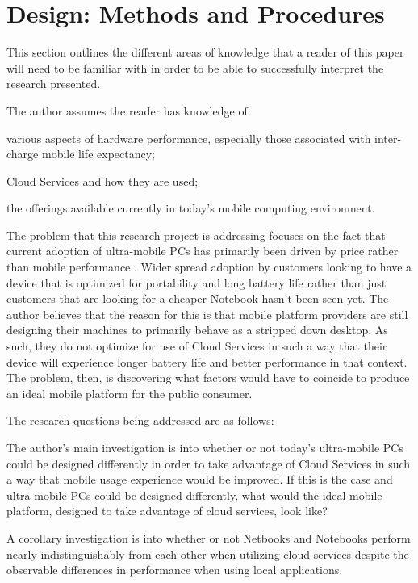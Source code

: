 \section{Design: Methods and Procedures}

This section outlines the different areas of knowledge that a reader of this
paper will need to be familiar with in order to be able to successfully
interpret the research presented.

The author assumes the reader has knowledge of:
\begin{inparaenum}[(1)]
\item various aspects of hardware performance, especially those associated with
  inter-charge mobile life expectancy;
\item Cloud Services and how they are used;
\item the offerings available currently in today's mobile
  computing environment.
\end{inparaenum}

The problem that this research project is addressing focuses on the fact that
current adoption of ultra-mobile PCs has primarily been driven by price rather
than mobile performance \citep{ap2009}.  Wider spread adoption by customers
looking to have a device that is optimized for portability and long battery life
rather than just customers that are looking for a cheaper Notebook hasn't been
seen yet.  The author believes that the reason for this is that mobile platform
providers are still designing their machines to primarily behave as a stripped
down desktop.  As such, they do not optimize for use of Cloud Services in such a
way that their device will experience longer battery life and better performance
in that context.  The problem, then, is discovering what factors would have to
coincide to produce an ideal mobile platform for the public consumer.

The research questions being addressed are as follows:
\begin{inparaenum}[(1)]
  \item The author's main investigation is into whether or not today's
    ultra-mobile PCs could be designed differently in order to take advantage of
    Cloud Services in such a way that mobile usage experience would be improved.
    If this is the case and ultra-mobile PCs could be designed differently, what
    would the ideal mobile platform, designed to take advantage of cloud
    services, look like?
  \item A corollary investigation is into whether or not Netbooks and Notebooks
    perform nearly indistinguishably from each other when utilizing cloud
    services despite the observable differences in performance when using local
    applications.
\end{inparaenum}

